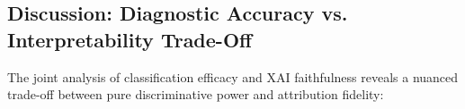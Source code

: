 \begin{table}[htbp]
\centering
\caption{M4 XAI Faithfulness Benchmark Results across Field-Robust YOLO Classifiers (NeurIPS 2023 Protocol).}
\label{tab:m4_faithfulness}
\end{table}

\subsection{Discussion: Diagnostic Accuracy vs. Interpretability Trade-Off}
\label{subsec:tradeoff_discussion}

The joint analysis of classification efficacy and XAI faithfulness reveals a nuanced trade-off between pure discriminative power and attribution fidelity:

